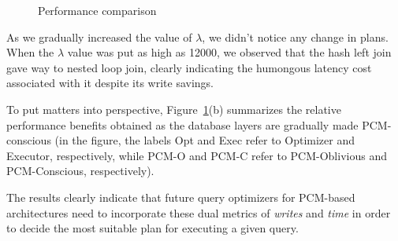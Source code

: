 \begin{figure}[htbp]
\centering
	

\caption{Performance comparison}
\label{fig:perf_comp}
\end{figure}

As we gradually increased the value of $\lambda$, we didn't notice any change in plans. When the $\lambda$ value was put as high as 12000, we observed that the hash left join gave way to nested loop join, clearly indicating the humongous latency cost associated with it despite its write savings.

To put matters into perspective, Figure~\ref{fig:perf_comp}(b) summarizes
the relative performance benefits obtained as the database layers are
gradually made PCM-conscious (in the figure, the labels Opt and Exec refer to Optimizer and Executor, respectively, while PCM-O and PCM-C
refer to PCM-Oblivious and PCM-Conscious, respectively). 

The results clearly indicate that future query optimizers for PCM-based architectures need to incorporate these dual metrics of \emph{writes} and \emph{time} in order to decide the most suitable plan for executing a given query.




